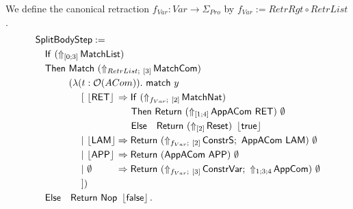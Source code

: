 \begin{definition}
  \label{def:JumpTarget}
  We define the canonical retraction $f_{Var} : Var \to \Sigma_{Pro}$ by $f_{Var} := RetrRgt \circ RetrList$.
  \begin{alignat*}{1}
    & \MS{SplitBodyStep} := \\
    & \quad \MS{If}~(\LiftTapes{\MS{MatchList}}{\Vector{0;3}}) \\
    & \quad \MS{Then}~\Match~(\LiftBoth{\MS{MatchCom}}{RetrList}{\Vector{3}}) \\
    & \quad \phantom{\MS{Then}}~(\lambda (t : \Option(ACom)).~\MS{match}~y\\
    & \quad \phantom{\MS{Then}~(\lambda}~[~ \phalign{\Some{\MS{LAM}}}{\Some{\MS{RET}}} \Rightarrow \MS{If}~(\LiftBoth{\MS{MatchNat}}{f_{Var}}{\Vector{2}}) \\
    & \quad \phantom{\MS{Then}~(\lambda~[~ \Some{\MS{LAM} \Rightarrow}}~\MS{Then}~ \Return{(\LiftTapes{\MS{AppACom~\MS{RET}}}{\Vector{1;4}})}{\None} \\
    & \quad \phantom{\MS{Then}~(\lambda~[~ \Some{\MS{LAM} \Rightarrow}}~\MS{Else}~~~ \Return{(\LiftTapes{\MS{Reset}}{\Vector{2}})}{\Some\true} \\
    & \quad \phantom{\MS{Then}~(\lambda}~|~ \phalign{\Some{\MS{LAM}}}{\Some{\MS{LAM}}} \Rightarrow \Return{(\LiftBoth{\MS{ConstrS}}{f_{Var}}{\Vector{2}} \Seq \MS{AppACom}~\MS{LAM})}{\None} \\
    & \quad \phantom{\MS{Then}~(\lambda}~|~ \phalign{\Some{\MS{LAM}}}{\Some{\MS{APP}}} \Rightarrow \Return{(\MS{AppACom}~\MS{APP})}{\None} \\
    & \quad \phantom{\MS{Then}~(\lambda}~|~ \phalign{\Some{\MS{LAM}}}{\None} \Rightarrow \Return{(\LiftBoth{\MS{ConstrVar}}{f_{Var}}{\Vector{3}} \Seq \LiftTapes{\MS{AppCom}}{1;3;4})}{\None} \\
    & \quad \phantom{\MS{Then}~(\lambda}~]) \\
    & \quad \MS{Else}~~~ \Return{\Nop}{\Some\false}.
  \end{alignat*}

\end{definition}
